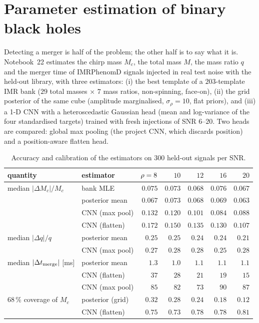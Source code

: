 \section{Parameter estimation of binary black holes}\label{sec:pe}
Detecting a merger is half of the problem; the other half is to say what it is. Notebook~22 estimates the chirp mass $M_c$, the total mass $M$, the mass ratio $q$ and the merger time of IMRPhenomD signals injected in real test noise with the held-out library, with three estimators: (i) the best template of a $203$-template IMR bank ($29$ total masses $\times$ $7$ mass ratios, non-spinning, face-on), (ii) the grid posterior of the same cube (amplitude marginalised, $\sigma_\rho=10$, flat priors), and (iii) a 1-D CNN with a heteroscedastic Gaussian head (mean and log-variance of the four standardised targets) trained with fresh injections of SNR $6$--$20$. Two heads are compared: global max pooling (the project CNN, which discards position) and a position-aware flatten head.
\begin{table}[h]\centering\small
\begin{tabular}{llrrrrr}
\toprule
quantity & estimator & $\rho=8$ & $10$ & $12$ & $16$ & $20$\\
\midrule
median $|\Delta M_c|/M_c$ & bank MLE & $0.075$ & $0.073$ & $0.068$ & $0.076$ & $0.067$\\
 & posterior mean & $0.067$ & $0.073$ & $0.068$ & $0.069$ & $0.063$\\
 & CNN (max pool) & $0.132$ & $0.120$ & $0.101$ & $0.084$ & $0.088$\\
 & CNN (flatten) & $0.172$ & $0.150$ & $0.135$ & $0.130$ & $0.107$\\
median $|\Delta q|/q$ & posterior mean & $0.25$ & $0.25$ & $0.24$ & $0.24$ & $0.21$\\
 & CNN (max pool) & $0.27$ & $0.28$ & $0.28$ & $0.25$ & $0.28$\\
median $|\Delta t_{\rm merge}|$ [ms] & posterior mean & $1.3$ & $1.0$ & $1.1$ & $1.1$ & $1.1$\\
 & CNN (flatten) & $37$ & $28$ & $21$ & $19$ & $15$\\
 & CNN (max pool) & $85$ & $82$ & $73$ & $90$ & $87$\\
\midrule
68\,\% coverage of $M_c$ & posterior (grid) & $0.32$ & $0.28$ & $0.24$ & $0.18$ & $0.12$\\
 & CNN (flatten) & $0.75$ & $0.73$ & $0.78$ & $0.78$ & $0.81$\\
\bottomrule
\end{tabular}
\caption{Accuracy and calibration of the estimators on $300$ held-out signals per SNR.}\label{tab:pe}
\end{table}
